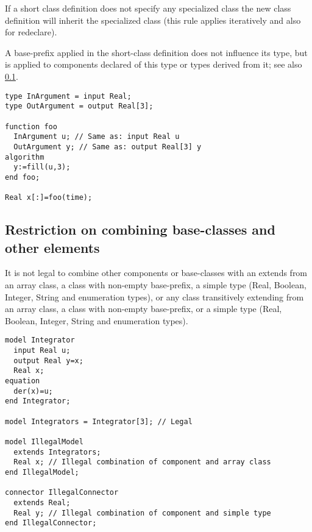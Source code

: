 If a short class definition does not specify any specialized class the
new class definition will inherit the specialized class (this rule
applies iteratively and also for redeclare).

A base-prefix applied in the short-class definition does not influence
its type, but is applied to components declared of this type or types
derived from it; see also \cref{restriction-on-combining-base-classes-and-other-elements}.

\begin{example}
\begin{lstlisting}[language=modelica]
type InArgument = input Real;
type OutArgument = output Real[3];

function foo
  InArgument u; // Same as: input Real u
  OutArgument y; // Same as: output Real[3] y
algorithm
  y:=fill(u,3);
end foo;

Real x[:]=foo(time);
\end{lstlisting}
\end{example}

\subsection{Restriction on combining base-classes and other elements}\label{restriction-on-combining-base-classes-and-other-elements}

It is not legal to combine other components or base-classes with an
extends from an array class, a class with non-empty base-prefix, a
simple type (Real, Boolean, Integer, String and enumeration types), or
any class transitively extending from an array class, a class with
non-empty base-prefix, or a simple type (Real, Boolean, Integer, String
and enumeration types).

\begin{example}
\begin{lstlisting}[language=modelica]
model Integrator
  input Real u;
  output Real y=x;
  Real x;
equation
  der(x)=u;
end Integrator;

model Integrators = Integrator[3]; // Legal

model IllegalModel
  extends Integrators;
  Real x; // Illegal combination of component and array class
end IllegalModel;

connector IllegalConnector
  extends Real;
  Real y; // Illegal combination of component and simple type
end IllegalConnector;
\end{lstlisting}
\end{example}


